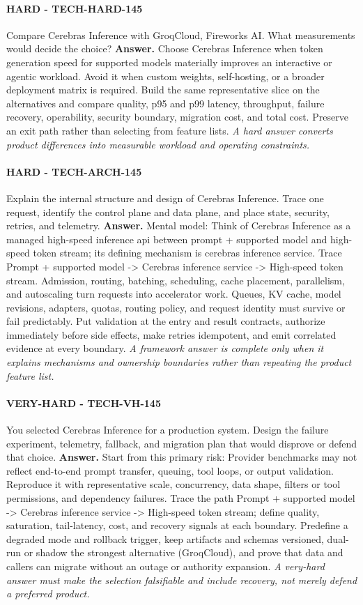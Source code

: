 \paragraph{HARD - TECH-HARD-145} Compare Cerebras Inference with GroqCloud, Fireworks AI. What measurements would decide the choice?
\textbf{Answer.} Choose Cerebras Inference when token generation speed for supported models materially improves an interactive or agentic workload. Avoid it when custom weights, self-hosting, or a broader deployment matrix is required. Build the same representative slice on the alternatives and compare quality, p95 and p99 latency, throughput, failure recovery, operability, security boundary, migration cost, and total cost. Preserve an exit path rather than selecting from feature lists.
\textit{A hard answer converts product differences into measurable workload and operating constraints.}
\paragraph{HARD - TECH-ARCH-145} Explain the internal structure and design of Cerebras Inference. Trace one request, identify the control plane and data plane, and place state, security, retries, and telemetry.
\textbf{Answer.} Mental model: Think of Cerebras Inference as a managed high-speed inference api between prompt + supported model and high-speed token stream; its defining mechanism is cerebras inference service. Trace Prompt + supported model -> Cerebras inference service -> High-speed token stream. Admission, routing, batching, scheduling, cache placement, parallelism, and autoscaling turn requests into accelerator work. Queues, KV cache, model revisions, adapters, quotas, routing policy, and request identity must survive or fail predictably. Put validation at the entry and result contracts, authorize immediately before side effects, make retries idempotent, and emit correlated evidence at every boundary.
\textit{A framework answer is complete only when it explains mechanisms and ownership boundaries rather than repeating the product feature list.}
\paragraph{VERY-HARD - TECH-VH-145} You selected Cerebras Inference for a production system. Design the failure experiment, telemetry, fallback, and migration plan that would disprove or defend that choice.
\textbf{Answer.} Start from this primary risk: Provider benchmarks may not reflect end-to-end prompt transfer, queuing, tool loops, or output validation. Reproduce it with representative scale, concurrency, data shape, filters or tool permissions, and dependency failures. Trace the path Prompt + supported model -> Cerebras inference service -> High-speed token stream; define quality, saturation, tail-latency, cost, and recovery signals at each boundary. Predefine a degraded mode and rollback trigger, keep artifacts and schemas versioned, dual-run or shadow the strongest alternative (GroqCloud), and prove that data and callers can migrate without an outage or authority expansion.
\textit{A very-hard answer must make the selection falsifiable and include recovery, not merely defend a preferred product.}
